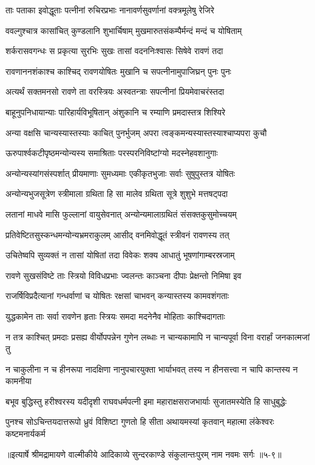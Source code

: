 \twolineshloka
{ताः पताका इवोद्धूताः पत्नीनां रुचिरप्रभाः}
{नानावर्णसुवर्णानां वक्त्रमूलेषु रेजिरे} %

\twolineshloka
{ववल्गुश्चात्र कासांचित् कुण्डलानि शुभार्चिषाम्}
{मुखमारुतसंकम्पैर्मन्दं मन्दं च योषिताम्} %

\twolineshloka
{शर्करासवगन्धः स प्रकृत्या सुरभिः सुखः}
{तासां वदननिःश्वासः सिषेवे रावणं तदा} %

\twolineshloka
{रावणाननशंकाश्च काश्चिद् रावणयोषितः}
{मुखानि च सपत्नीनामुपाजिघ्रन् पुनः पुनः} %

\twolineshloka
{अत्यर्थं सक्तमनसो रावणे ता वरस्त्रियः}
{अस्वतन्त्राः सपत्नीनां प्रियमेवाचरंस्तदा} %

\twolineshloka
{बाहूनुपनिधायान्याः पारिहार्यविभूषितान्}
{अंशुकानि च रम्याणि प्रमदास्तत्र शिश्यिरे} %

\twolineshloka
{अन्या वक्षसि चान्यस्यास्तस्याः काचित् पुनर्भुजम्}
{अपरा त्वङ्कमन्यस्यास्तस्याश्चाप्यपरा कुचौ} %

\twolineshloka
{ऊरुपार्श्वकटीपृष्ठमन्योन्यस्य समाश्रिताः}
{परस्परनिविष्टांग्यो मदस्नेहवशानुगाः} %

\twolineshloka
{अन्योन्यस्यांगसंस्पर्शात् प्रीयमाणाः सुमध्यमाः}
{एकीकृतभुजाः सर्वाः सुषुपुस्तत्र योषितः} %

\twolineshloka
{अन्योन्यभुजसूत्रेण स्त्रीमाला ग्रथिता हि सा}
{मालेव ग्रथिता सूत्रे शुशुभे मत्तषट्पदा} %

\twolineshloka
{लतानां माधवे मासि फुल्लानां वायुसेवनात्}
{अन्योन्यमालाग्रथितं संसक्तकुसुमोच्चयम्} %

\twolineshloka
{प्रतिवेष्टितसुस्कन्धमन्योन्यभ्रमराकुलम्}
{आसीद् वनमिवोद्धूतं स्त्रीवनं रावणस्य तत्} %

\twolineshloka
{उचितेष्वपि सुव्यक्तं न तासां योषितां तदा}
{विवेकः शक्य आधातुं भूषणांगाम्बरस्रजाम्} %

\twolineshloka
{रावणे सुखसंविष्टे ताः स्त्रियो विविधप्रभाः}
{ज्वलन्तः काञ्चना दीपाः प्रेक्षन्तो निमिषा इव} %

\twolineshloka
{राजर्षिविप्रदैत्यानां गन्धर्वाणां च योषितः}
{रक्षसां चाभवन् कन्यास्तस्य कामवशंगताः} %

\twolineshloka
{युद्धकामेन ताः सर्वा रावणेन हृताः स्त्रियः}
{समदा मदनेनैव मोहिताः काश्चिदागताः} %

\twolineshloka
{न तत्र काश्चित् प्रमदाः प्रसह्य वीर्योपपन्नेन गुणेन लब्धाः}
{न चान्यकामापि न चान्यपूर्वा विना वरार्हां जनकात्मजां तु} %

\twolineshloka
{न चाकुलीना न च हीनरूपा नादक्षिणा नानुपचारयुक्ता}
{भार्याभवत् तस्य न हीनसत्त्वा न चापि कान्तस्य न कामनीया} %

\twolineshloka
{बभूव बुद्धिस्तु हरीश्वरस्य यदीदृशी राघवधर्मपत्नी}
{इमा महाराक्षसराजभार्याः सुजातमस्येति हि साधुबुद्धेः} %

\twolineshloka
{पुनश्च सोऽचिन्तयदात्तरूपो ध्रुवं विशिष्टा गुणतो हि सीता}
{अथायमस्यां कृतवान् महात्मा लंकेश्वरः कष्टमनार्यकर्म} %


॥इत्यार्षे श्रीमद्रामायणे वाल्मीकीये आदिकाव्ये सुन्दरकाण्डे संकुलान्तःपुरम् नाम नवमः सर्गः ॥५-९॥
